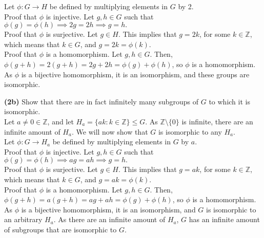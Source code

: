 \documentclass[12pt,letterpaper]{article}
\begin{document}
Let \(\phi : G \to H\) be defined by multiplying elements in \(G\) by 2. \\

Proof that \(\phi\) is injective. Let \(g, h \in G\) such that \(\phi(g) = \phi(h) \implies 2g = 2h \implies g = h.\) \\

Proof that \(\phi\) is surjective. Let \(g \in H\). This implies that \(g = 2k\), for some \(k \in \mathbb{Z}\), which means that \(k \in G\), and \(g = 2k = \phi(k)\). \\

Proof that \(\phi\) is a homomorphism. Let \(g,h \in G\). Then, \(\phi(g + h) = 2(g + h) = 2g + 2h = \phi(g) + \phi(h)\), so \(\phi\) is a homomorphism. \\

As \(\phi\) is a bijective homomorphism, it is an isomorphism, and these groups are isomorphic.

\textbf{(2b)} Show that there are in fact infinitely many subgroups of \(G\) to which it is isomorphic. \\

Let \(a\neq 0 \in \mathbb{Z}\), and let \(H_{a} = \{ak : k \in \mathbb{Z}\} \leq G\). As \(\mathbb{Z}\setminus \{0\}\) is infinite, there are an infinite amount of \(H_{a}\). We will now show that \(G\) is isomorphic to any \(H_{a}\). \\

Let \(\phi : G \to H_{a}\) be defined by multiplying elements in \(G\) by \(a\). \\

Proof that \(\phi\) is injective. Let \(g, h \in G\) such that \(\phi(g) = \phi(h) \implies ag = ah \implies g = h.\) \\

Proof that \(\phi\) is surjective. Let \(g \in H\). This implies that \(g = ak\), for some \(k \in \mathbb{Z}\), which means that \(k \in G\), and \(g = ak = \phi(k)\). \\

Proof that \(\phi\) is a homomorphism. Let \(g,h \in G\). Then, \(\phi(g + h) = a(g + h) = ag + ah = \phi(g) + \phi(h)\), so \(\phi\) is a homomorphism. \\

As \(\phi\) is a bijective homomorphism, it is an isomorphism, and \(G\) is isomorphic to an arbitrary \(H_{a}\). As there are an infinite amount of \(H_{a}\), \(G\) has an infinite amount of subgroups that are isomorphic to \(G\). \\
\end{document}
